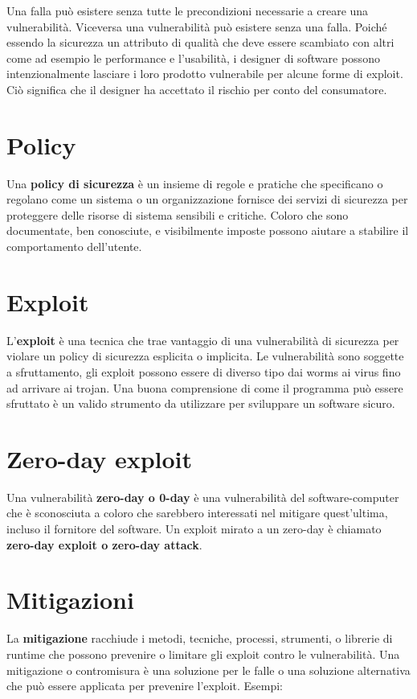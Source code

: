 Una falla può esistere senza tutte le precondizioni necessarie a creare una
vulnerabilità. Viceversa una vulnerabilità può esistere senza una falla.
Poiché essendo la sicurezza un attributo di qualità che deve essere scambiato con
altri come ad esempio le performance e l'usabilità, i designer di software possono
intenzionalmente lasciare i loro prodotto vulnerabile per alcune forme di exploit.
Ciò significa che il designer ha accettato il rischio per conto del consumatore.

\section{Policy}

Una \textbf{policy di sicurezza} è un insieme di regole e pratiche che specificano o
regolano come un sistema o un organizzazione fornisce dei servizi di sicurezza per
proteggere delle risorse di sistema sensibili e critiche. Coloro che sono documentate,
ben conosciute, e visibilmente imposte possono aiutare a stabilire il comportamento
dell'utente.

\section{Exploit}

L'\textbf{exploit} è una tecnica che trae vantaggio di una vulnerabilità di sicurezza
per violare un policy di sicurezza esplicita o implicita.
Le vulnerabilità sono soggette a sfruttamento, gli exploit possono essere di diverso
tipo dai worms ai virus fino ad arrivare ai trojan.
Una buona comprensione di come il programma può essere sfruttato è un valido strumento
da utilizzare per sviluppare un software sicuro.

\section{Zero-day exploit}

Una vulnerabilità \textbf{zero-day o 0-day} è una vulnerabilità del software-computer
che è sconosciuta a coloro che sarebbero interessati nel mitigare quest'ultima,
incluso il fornitore del software.  Un exploit mirato a un zero-day è
chiamato \textbf{zero-day exploit o zero-day attack}.

\section{Mitigazioni}

La \textbf{mitigazione} racchiude i metodi, tecniche, processi, strumenti, o librerie
di runtime che possono prevenire o limitare gli exploit contro le vulnerabilità.
Una mitigazione o contromisura è una soluzione per le falle o una soluzione
alternativa che può essere applicata per prevenire l'exploit.
Esempi:


